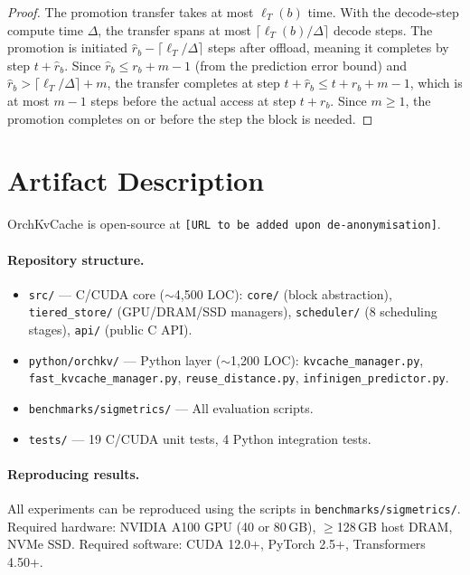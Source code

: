 \documentclass[acmsmall,nonacm,screen]{acmart}
\newcommand{\sys}{OrchKvCache}
\begin{document}
\begin{proof}
The promotion transfer takes at most $\ell_T(b)$ time.  With the decode-step
compute time $\Delta$, the transfer spans at most
$\lceil \ell_T(b) / \Delta \rceil$ decode steps.  The promotion is initiated
$\hat{r}_b - \lceil \ell_T / \Delta \rceil$ steps after offload, meaning
it completes by step $t + \hat{r}_b$.  Since $\hat{r}_b \leq r_b + m - 1$
(from the prediction error bound) and $\hat{r}_b > \lceil \ell_T / \Delta
\rceil + m$, the transfer completes at step $t + \hat{r}_b \leq t + r_b +
m - 1$, which is at most $m - 1$ steps before the actual access at step
$t + r_b$.  Since $m \geq 1$, the promotion completes on or before the step
the block is needed.
\end{proof}


\section{Artifact Description}\label{app:artifact}

\sys{} is open-source at \texttt{[URL to be added upon de-anonymisation]}.

\paragraph{Repository structure.}
\begin{itemize}
  \item \texttt{src/} --- C/CUDA core (${\sim}$4{,}500 LOC):
    \texttt{core/} (block abstraction), \texttt{tiered\_store/}
    (GPU/DRAM/SSD managers), \texttt{scheduler/} (8 scheduling stages),
    \texttt{api/} (public C API).
  \item \texttt{python/orchkv/} --- Python layer (${\sim}$1{,}200 LOC):
    \texttt{kvcache\_manager.py}, \texttt{fast\_kvcache\_manager.py},
    \texttt{reuse\_distance.py}, \texttt{infinigen\_predictor.py}.
  \item \texttt{benchmarks/sigmetrics/} --- All evaluation scripts.
  \item \texttt{tests/} --- 19 C/CUDA unit tests, 4 Python integration tests.
\end{itemize}

\paragraph{Reproducing results.}
All experiments can be reproduced using the scripts in
\texttt{benchmarks/sigmetrics/}.  Required hardware: NVIDIA A100 GPU
(40 or 80\,GB), $\geq$128\,GB host DRAM, NVMe SSD.
Required software: CUDA 12.0+, PyTorch 2.5+, Transformers 4.50+.
\end{document}
